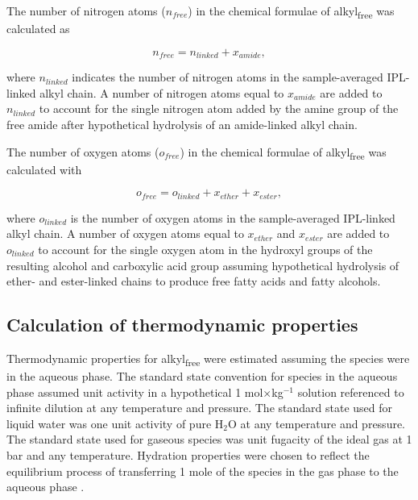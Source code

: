 The number of nitrogen atoms ($n_{free}$) in the chemical formulae of alkyl\textsubscript{free} was calculated as

\begin{equation}
    n_{free} = n_{linked} + x_{amide},
\end{equation}

\noindent where $n_{linked}$ indicates the number of nitrogen atoms in the sample-averaged IPL-linked alkyl chain. A number of nitrogen atoms equal to $x_{amide}$ are added to $n_{linked}$ to account for the single nitrogen atom added by the amine group of the free amide after hypothetical hydrolysis of an amide-linked alkyl chain.

The number of oxygen atoms ($o_{free}$) in the chemical formulae of alkyl\textsubscript{free} was calculated with

\begin{equation}
    o_{free} = o_{linked} + x_{ether} + x_{ester},
\end{equation}

\noindent where $o_{linked}$ is the number of oxygen atoms in the sample-averaged IPL-linked alkyl chain. A number of oxygen atoms equal to $x_{ether}$ and $x_{ester}$ are added to $o_{linked}$ to account for the single oxygen atom in the hydroxyl groups of the resulting alcohol and carboxylic acid group assuming hypothetical hydrolysis of ether- and ester-linked chains to produce free fatty acids and fatty alcohols.

\subsection{Calculation of thermodynamic properties}




Thermodynamic properties for alkyl\textsubscript{free} were estimated assuming the species were in the aqueous phase. The standard state convention for species in the aqueous phase assumed unit activity in a hypothetical 1 mol$\times$kg$^{-1}$ solution referenced to infinite dilution at any temperature and pressure. The standard state used for liquid water was one unit activity of pure H$_{2}$O at any temperature and pressure. The standard state used for gaseous species was unit fugacity of the ideal gas at 1 bar and any temperature. Hydration properties were chosen to reflect the equilibrium process of transferring 1 mole of the species in the gas phase to the aqueous phase \citep{plyasunov2000thermodynamic}.

